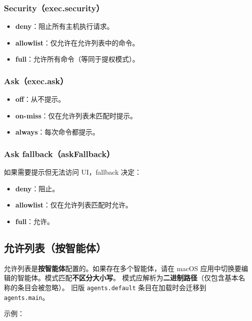 \subsubsection{Security（exec.security）}


\begin{itemize}
  \item \textbf{deny}：阻止所有主机执行请求。
  \item \textbf{allowlist}：仅允许在允许列表中的命令。
  \item \textbf{full}：允许所有命令（等同于提权模式）。
\end{itemize}


\subsubsection{Ask（exec.ask）}


\begin{itemize}
  \item \textbf{off}：从不提示。
  \item \textbf{on-miss}：仅在允许列表未匹配时提示。
  \item \textbf{always}：每次命令都提示。
\end{itemize}


\subsubsection{Ask fallback（askFallback）}


如果需要提示但无法访问 UI，fallback 决定：

\begin{itemize}
  \item \textbf{deny}：阻止。
  \item \textbf{allowlist}：仅在允许列表匹配时允许。
  \item \textbf{full}：允许。
\end{itemize}


\subsection{允许列表（按智能体）}


允许列表是\textbf{按智能体}配置的。如果存在多个智能体，请在 macOS 应用中切换要编辑的智能体。模式匹配\textbf{不区分大小写}。
模式应解析为\textbf{二进制路径}（仅包含基本名称的条目会被忽略）。
旧版 \texttt{agents.default} 条目在加载时会迁移到 \texttt{agents.main}。

示例：

